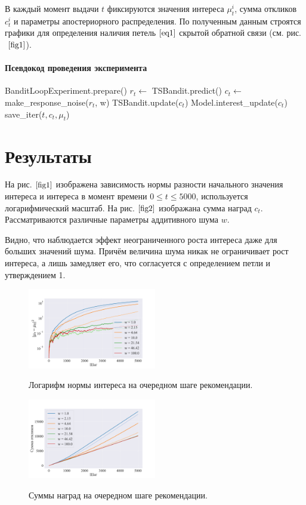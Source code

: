 \documentclass[12pt, twoside]{article}
\begin{document}
В каждый момент выдачи $t$ фиксируются значения интереса $\mu_t^i$, сумма откликов $c_t^i$ и параметры апостериорного распределения. 
По полученным данным строятся графики для определения наличия петель $\eqref{eq1}$ скрытой обратной связи (см. рис.$~\ref{fig1}$).

\paragraph{Псевдокод проведения эксперимента}
\begin{algorithmic}
  \STATE BanditLoopExperiment.prepare()
    \STATE $r_t \leftarrow$ TSBandit.predict()
    \STATE $c_t \leftarrow$ make\_response\_noise($r_t$, w)
    \STATE TSBandit.update($c_t$)
    \STATE Model.interest\_update($c_t$)
    \STATE save\_iter($t, c_t, \mu_t$)
  \ENDFOR
\end{algorithmic}

\section{Результаты}
На рис.$~\ref{fig1}$ изображена зависимость нормы разности начального значения интереса и интереса в момент времени $0 \leq t \leq 5000$, используется логарифмический масштаб. 
На рис.$~\ref{fig2}$ изображана сумма наград $c_t$.
Рассматриваются различные параметры аддитивного шума $w$.

Видно, что наблюдается эффект неограниченного роста интереса даже для больших значений шума. 
Причём величина шума никак не ограничивает рост интереса, а лишь замедляет его, что согласуется с определением петли и утверждением 1. 


\begin{figure}[h]
  \begin{multicols}{2}
    \hfill
    \includegraphics[width=0.5\textwidth]{../figures/norm_interest.pdf}
    \hfill
    \caption{Логарифм нормы интереса на очередном шаге рекомендации.}
    \label{fig1}
    \hfill
    \includegraphics[width=0.5\textwidth]{../figures/rewards.pdf}
    \hfill
    \caption{Суммы наград на очередном шаге рекомендации.}
    \label{fig2}
  \end{multicols}
\end{figure}
\end{document}
